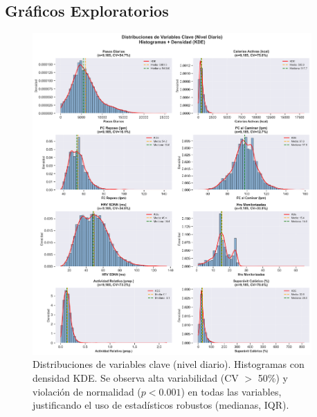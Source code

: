 \documentclass[12pt,letterpaper,twoside]{report}
\begin{document}
\subsection{Gráficos Exploratorios}

\begin{figure}[htbp]
\centering
\includegraphics[width=0.95\textwidth]{../analisis_u/descriptivos_visuales/histogramas_con_kde.png}
\caption{Distribuciones de variables clave (nivel diario). Histogramas con densidad KDE. Se observa alta variabilidad (CV $>$ 50\%) y violación de normalidad ($p < 0.001$) en todas las variables, justificando el uso de estadísticos robustos (medianas, IQR).}
\label{fig:histogramas_kde}
\end{figure}
\end{document}
